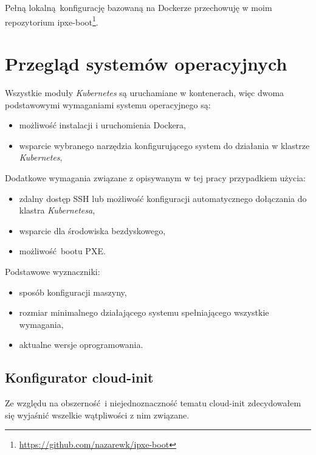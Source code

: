 \documentclass[a4paper,12pt,twoside,openany]{report}
\providecommand{\tightlist}{%
  \setlength{\itemsep}{0pt}\setlength{\parskip}{0pt}}
\DeclareRobustCommand{\href}[2]{#2\footnote{\url{#1}}}
\begin{document}
Pełną lokalną~konfigurację bazowaną na Dockerze przechowuję w moim
repozytorium \href{https://github.com/nazarewk/ipxe-boot}{ipxe-boot}.

\hypertarget{przeglux105d-systemuxf3w-operacyjnych}{%
\chapter{Przegląd systemów
operacyjnych}\label{przeglux105d-systemuxf3w-operacyjnych}}

Wszystkie moduły \emph{Kubernetes} są uruchamiane w kontenerach, więc
dwoma podstawowymi wymaganiami systemu operacyjnego są:

\begin{itemize}
\tightlist
\item
  możliwość instalacji i uruchomienia Dockera,
\item
  wsparcie wybranego narzędzia konfigurującego system do działania w
  klastrze \emph{Kubernetes},
\end{itemize}

Dodatkowe wymagania związane z opisywanym w tej pracy przypadkiem
użycia:

\begin{itemize}
\tightlist
\item
  zdalny dostęp SSH lub możliwość konfiguracji automatycznego dołączania
  do klastra \emph{Kubernetesa},
\item
  wsparcie dla środowiska bezdyskowego,
\item
  możliwość~bootu PXE.
\end{itemize}

Podstawowe wyznaczniki:

\begin{itemize}
\tightlist
\item
  sposób konfiguracji maszyny,
\item
  rozmiar minimalnego działającego systemu spełniającego wszystkie
  wymagania,
\item
  aktualne wersje oprogramowania.
\end{itemize}

\hypertarget{cloud-init-config}{%
\section{Konfigurator cloud-init}\label{cloud-init-config}}

Ze względu na obszerność~i niejednoznaczność tematu cloud-init
zdecydowałem się wyjaśnić wszelkie wątpliwości z nim związane.
\end{document}

